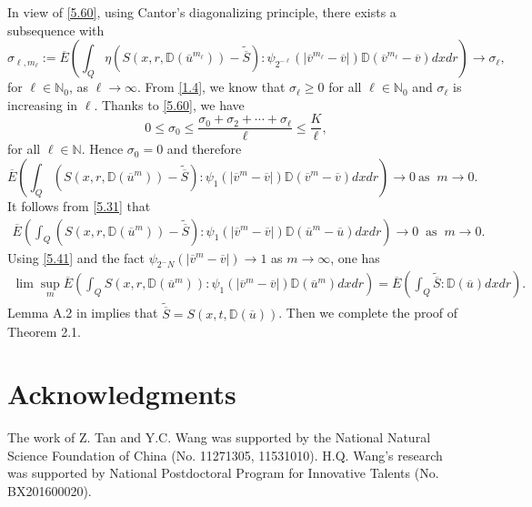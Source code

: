 \documentclass[reqno]{amsart}
\theoremstyle{definition}
\theoremstyle{remark}
\numberwithin{equation}{section} \allowdisplaybreaks
\begin{document}
In view of \eqref{5.60}, using Cantor's diagonalizing principle,
there exists a subsequence with
$$\sigma_{\ell,m_\ell}\!:=\overline{E}\left(\int_Q \eta(S(x,r,\mathbb{D}(\overline{u}^{m_\ell}))\!-
\!\tilde{\overline{S}}):\psi_{2^{-\ell}}(|\overline{v}^{m_{\ell}}-\overline{v}|)\mathbb{D}(\overline{v}^{m_{\ell}}-\overline{v})dxdr\right)\rightarrow\sigma_\ell,$$
for $\ell\in \mathbb{N}_0$, as $\ell\rightarrow\infty$. From
\eqref{1.4}, we know that $\sigma_\ell\geq0$ for all $\ell\in
\mathbb{N}_0$
 and $\sigma_\ell$ is increasing in $\ell$. Thanks to \eqref{5.60}, we have
$$0\leq\sigma_0\leq\frac{\sigma_0+\sigma_2+\cdots+\sigma_\ell}{\ell}\leq\frac{K}{\ell},$$
for all $\ell\in \mathbb{N}$. Hence $\sigma_0=0$ and therefore
$$\overline{E}\left(\int_Q (S(x,r,\mathbb{D}(\overline{u}^m))\!-\tilde{\overline{S}}):\psi_1(|\overline{v}^{m}-\overline{v}|)
\mathbb{D}(\overline{v}^{m}-\overline{v})dxdr\right)\rightarrow0~\mbox{
as }~ m\rightarrow0.$$ It follows from \eqref{5.31} that
\begin{equation}\label{5.61}
\begin{split}
\overline{E}\left(\int_Q
(S(x,r,\mathbb{D}(\overline{u}^m))\!-\tilde{\overline{S}}):\psi_1(|\overline{v}^{m}-\overline{v}|)\mathbb{D}
(\overline{u}^{m}-\overline{u})dxdr\right)\rightarrow0~\mbox{ as }~
m\rightarrow0.
\end{split}
\end{equation}
Using \eqref{5.41} and the fact
$\psi_{2^-N}(|\overline{v}^m-\overline{v}|)\rightarrow1$ as
$m\rightarrow\infty$, one has
\begin{equation}\label{5.62}
\begin{split}
\lim\sup_{m}\overline{E}\left(\int_Q
S(x,r,\mathbb{D}(\overline{u}^m))\!:\psi_1(|\overline{v}^{m}-\overline{v}|)\mathbb{D}
(\overline{u}^{m})dxdr\right)=\overline{E}\left(\int_Q\tilde{\overline{S}}\!:\mathbb{D}
(\overline{u})dxdr\right).
\end{split}
\end{equation}
Lemma A.2 in \cite{JW} implies that
$\tilde{\overline{S}}=S(x,t,\mathbb{D}(\overline{u}))$. Then we
complete the proof of Theorem 2.1.

\section*{Acknowledgments}
The work of Z. Tan and Y.C. Wang was supported by the National
Natural Science Foundation of China (No. 11271305, 11531010). H.Q.
Wang's research was supported by National Postdoctoral Program for
Innovative Talents (No. BX201600020).
\end{document}
